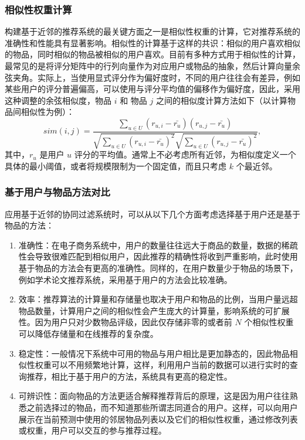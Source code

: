 \subsubsection{相似性权重计算}
构建基于近邻的推荐系统的最关键方面之一是相似性权重的计算，它对推荐系统的准确性和性能具有显著影响。相似性的计算基于这样的共识：相似的用户喜欢相似的物品，同时相似的物品被相似的用户喜欢。目前有多种方式用于相似性的计算，最常见的是将评分矩阵中的行列向量作为对应用户或物品的抽象，然后计算向量余弦夹角。实际上，当使用显式评分作为偏好度时，不同的用户往往会有差异，例如某些用户的评分普遍偏高，可以使用与评分平均值的偏移作为偏好度，因此，采用这种调整的余弦相似度，物品 $i$ 和 物品 $j$ 之间的相似度计算方法如下（以计算物品间相似性为例）：
\begin{equation}
sim(i,j) = \dfrac{\sum\limits_{u \in U} (r_{u,i} - \bar{r_u})  (r_{u,j} - \bar{r_u})} {   \sqrt {\sum\limits_{u \in U}  {(r_{u,i} - \bar{r_u})}^2  }    \sqrt {\sum\limits_{u \in U}  {(r_{u,j} - \bar{r_u})}^2  }  } ,
\end{equation}
其中，$r_u$ 是用户 $u$ 评分的平均值。通常上不必考虑所有近邻，为相似度定义一个具体的最小阈值，或者将规模限制为一个固定值，而且只考虑 $k$ 个最近邻\cite{Jannach2010Recommender}。

\subsubsection{基于用户与物品方法对比}
应用基于近邻的协同过滤系统时，可以从以下几个方面考虑选择基于用户还是基于物品的方法\cite{Desrosiers2011A}：
\begin{enumerate}
	\item {准确性}：在电子商务系统中，用户的数量往往远大于商品的数量，数据的稀疏性会导致很难匹配到相似用户，因此推荐的精确性将收到严重影响，此时使用基于物品的方法会有更高的准确性。同样的，在用户数量少于物品的场景下，例如学术论文推荐系统，采用基于用户的方法会比较准确。

	\item {效率}：推荐算法的计算量和存储量也取决于用户和物品的比例，当用户量远超物品数量，计算用户之间的相似性会产生庞大的计算量，影响系统的可扩展性。因为用户只对少数物品评级，因此仅存储非零的或者前 $N$ 个相似性权重可以降低存储量和在线推荐的复杂度。

	\item {稳定性}：一般情况下系统中可用的物品与用户相比是更加静态的，因此物品相似性权重可以不用频繁地计算，这样，利用用户当前的数据可以进行实时的查询推荐，相比于基于用户的方法，系统具有更高的稳定性。

	\item {可辨识性}：面向物品的方法更适合解释推荐背后的原理，这是因为用户往往熟悉之前选择过的物品，而不知道那些所谓志同道合的用户。这样，可以向用户展示在当前预测中使用的邻居物品列表以及它们的相似性权重，通过修改列表或权重，用户可以交互的参与推荐过程。

\end{enumerate}


